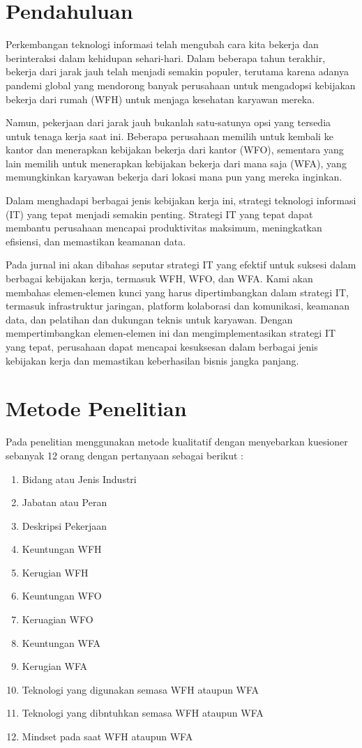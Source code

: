 \documentclass[review]{elsarticle}
\begin{document}
\linenumbers

\section{Pendahuluan}

Perkembangan teknologi informasi telah mengubah cara kita bekerja dan berinteraksi dalam kehidupan sehari-hari. Dalam beberapa tahun terakhir, bekerja dari jarak jauh telah menjadi semakin populer, terutama karena adanya pandemi global yang mendorong banyak perusahaan untuk mengadopsi kebijakan bekerja dari rumah (WFH) untuk menjaga kesehatan karyawan mereka.

Namun, pekerjaan dari jarak jauh bukanlah satu-satunya opsi yang tersedia untuk tenaga kerja saat ini. Beberapa perusahaan memilih untuk kembali ke kantor dan menerapkan kebijakan bekerja dari kantor (WFO), sementara yang lain memilih untuk menerapkan kebijakan bekerja dari mana saja (WFA), yang memungkinkan karyawan bekerja dari lokasi mana pun yang mereka inginkan.

Dalam menghadapi berbagai jenis kebijakan kerja ini, strategi teknologi informasi (IT) yang tepat menjadi semakin penting. Strategi IT yang tepat dapat membantu perusahaan mencapai produktivitas maksimum, meningkatkan efisiensi, dan memastikan keamanan data.

Pada jurnal ini akan dibahas seputar strategi IT yang efektif untuk suksesi dalam berbagai kebijakan kerja, termasuk WFH, WFO, dan WFA. Kami akan membahas elemen-elemen kunci yang harus dipertimbangkan dalam strategi IT, termasuk infrastruktur jaringan, platform kolaborasi dan komunikasi, keamanan data, dan pelatihan dan dukungan teknis untuk karyawan. Dengan mempertimbangkan elemen-elemen ini dan mengimplementasikan strategi IT yang tepat, perusahaan dapat mencapai kesuksesan dalam berbagai jenis kebijakan kerja dan memastikan keberhasilan bisnis jangka panjang.




\section{Metode Penelitian}

Pada penelitian menggunakan metode kualitatif dengan menyebarkan kuesioner sebanyak 12 orang dengan pertanyaan sebagai berikut : 
\begin{enumerate}[1]
\item Bidang atau Jenis Industri
\item Jabatan atau Peran
\item Deskripsi Pekerjaan
\item Keuntungan WFH
\item Kerugian WFH
\item Keuntungan WFO
\item Keruagian WFO
\item Keuntungan WFA
\item Kerugian WFA
\item Teknologi yang digunakan semasa WFH ataupun WFA
\item Teknologi yang dibntuhkan semasa WFH ataupun WFA
\item Mindset pada saat WFH ataupun WFA
\end{enumerate}
\end{document}

